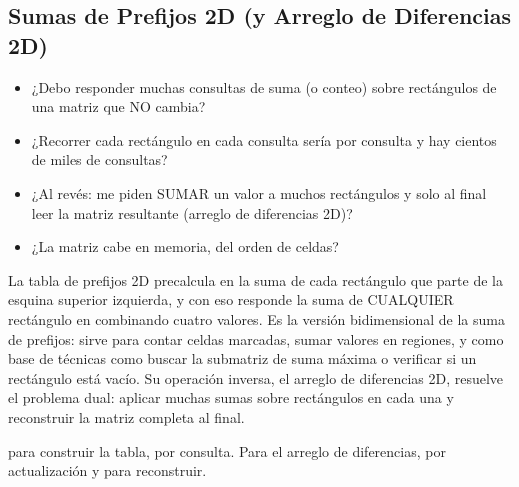 \subsection{Sumas de Prefijos 2D (y Arreglo de Diferencias 2D)}
\label{alg:3-8}


\begin{itemize}
\item ¿Debo responder muchas consultas de suma (o conteo) sobre rectángulos de una matriz que NO cambia?
\item ¿Recorrer cada rectángulo en cada consulta sería  por consulta y hay cientos de miles de consultas?
\item ¿Al revés: me piden SUMAR un valor a muchos rectángulos y solo al final leer la matriz resultante (arreglo de diferencias 2D)?
\item ¿La matriz cabe en memoria, del orden de  celdas?
\end{itemize}

 La tabla de prefijos 2D precalcula en  la suma de cada rectángulo que parte de la esquina superior izquierda, y con eso responde la suma de CUALQUIER rectángulo en  combinando cuatro valores. Es la versión bidimensional de la suma de prefijos: sirve para contar celdas marcadas, sumar valores en regiones, y como base de técnicas como buscar la submatriz de suma máxima o verificar si un rectángulo está vacío. Su operación inversa, el arreglo de diferencias 2D, resuelve el problema dual: aplicar muchas sumas sobre rectángulos en  cada una y reconstruir la matriz completa al final.

  para construir la tabla,  por consulta. Para el arreglo de diferencias,  por actualización y  para reconstruir.

